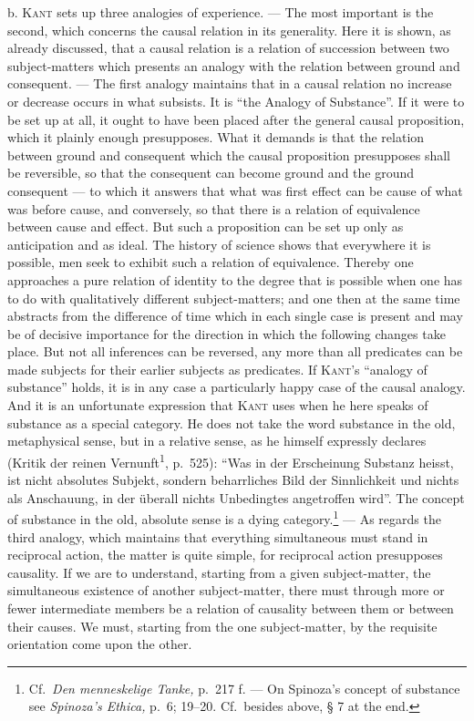 \documentclass[12pt]{book}
\newcommand{\opage}[1]{\marginnote{\footnotesize\textit{[#1]}}}
\begin{document}
b. \textsc{Kant} sets up three analogies of experience. --- The most important is
the second, which concerns the causal relation in its generality. Here it is
shown, as already discussed, that a causal relation is a relation of succession
between two subject-matters which presents an analogy with the relation between
ground and consequent. --- The first analogy maintains that in a causal relation
no \opage{92}increase or decrease occurs in what subsists. It is ``the Analogy of
Substance''. If it were to be set up at all, it ought to have been placed after
the general causal proposition, which it plainly enough presupposes. What it
demands is that the relation between ground and consequent which the causal
proposition presupposes shall be reversible, so that the consequent can become
ground and the ground consequent --- to which it answers that what was first
effect can be cause of what was before cause, and conversely, so that there is a
relation of equivalence between cause and effect. But such a proposition can be
set up only as anticipation and as ideal. The history of science shows that
everywhere it is possible, men seek to exhibit such a relation of equivalence.
Thereby one approaches a pure relation of identity to the degree that is possible
when one has to do with qualitatively different subject-matters; and one then at
the same time abstracts from the difference of time which in each single case is
present and may be of decisive importance for the direction in which the
following changes take place. But not all inferences can be reversed, any more
than all predicates can be made subjects for their earlier subjects as
predicates. If \textsc{Kant}'s ``analogy of substance'' holds, it is in any case
a particularly happy case of the causal analogy. And it is an unfortunate
expression that \textsc{Kant} uses when he here speaks of substance as a special
category. He does not take the word substance in the old, metaphysical sense, but
in a relative sense, as he himself expressly declares (Kritik der reinen
Vernunft\textsuperscript{1}, p.\ 525): ``Was in der Erscheinung Substanz heisst,
ist nicht absolutes Subjekt, sondern beharrliches Bild der Sinnlichkeit und
nichts als Anschauung, in der überall nichts Unbedingtes angetroffen wird''. The
concept of substance in the old, absolute sense \opage{93}is a dying
category.\footnote{Cf.\ \textit{Den menneskelige Tanke,} p.\ 217 f. --- On
Spinoza's concept of substance see \textit{Spinoza's Ethica,} p.\ 6; 19--20.
Cf.\ besides above, § 7 at the end.} --- As regards the third analogy, which
maintains that everything simultaneous must stand in reciprocal action, the
matter is quite simple, for reciprocal action presupposes causality. If we are to
understand, starting from a given subject-matter, the simultaneous existence of
another subject-matter, there must through more or fewer intermediate members be
a relation of causality between them or between their causes. We must, starting
from the one subject-matter, by the requisite orientation come upon the other.
\end{document}
